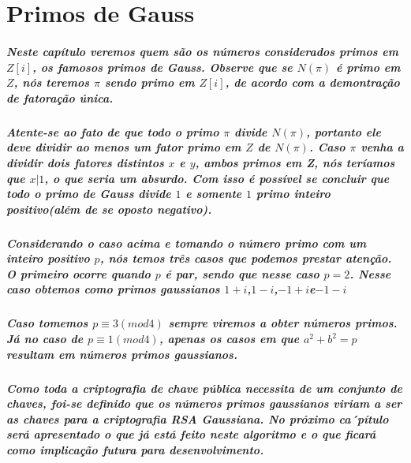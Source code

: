 \section{Primos de Gauss}
\subparagraph{
Neste cap\'itulo veremos quem s\~ao os n\'umeros considerados primos em $Z[i]$, os famosos primos de Gauss. Observe que se $N(\pi)$ \'e primo em $Z$, n\'os teremos $\pi$ sendo primo em $Z[i]$, de acordo com a demontra\c{c}\~ao de fatora\c{c}\~ao \'unica. }
\subparagraph{
Atente-se ao fato de que todo o primo $\pi$ divide $N(\pi)$, portanto ele deve dividir ao menos um fator primo em $Z$ de $N(\pi)$. Caso $\pi$ venha a dividir dois fatores distintos $x$ e $y$, ambos primos em Z, n\'os ter\'iamos que $x|1$, o que seria um absurdo. Com isso \'e poss\'ivel se concluir que todo o primo de Gauss divide $1$ e somente $1$ primo inteiro positivo(al\'em de se oposto negativo).
}
\subparagraph{
Considerando o caso acima e tomando o n\'umero primo com um inteiro positivo $p$, n\'os temos tr\^es casos que podemos prestar aten\c{c}\~ao. O primeiro ocorre quando $p$ \'e par, sendo que nesse caso $p=2$. Nesse caso obtemos como primos gaussianos $1+i$,$ 1-i$,$ -1+i $e$ -1-i $}
\subparagraph{
Caso tomemos $p \equiv 3(mod 4)$ sempre viremos a obter n\'umeros primos. J\'a no caso de $p \equiv 1(mod 4)$, apenas os casos em que $a^2+b^2=p$ resultam em n\'umeros primos gaussianos.
}
\subparagraph{
Como toda a criptografia de chave pública necessita de um conjunto de chaves, foi-se definido que os n\'umeros primos gaussianos viriam a ser as chaves para a criptografia RSA Gaussiana. No próximo ca´p\'itulo ser\'a apresentado o que j\'a est\'a feito neste algoritmo e o que ficar\'a como implica\c{c}\~ao futura para desenvolvimento.}
